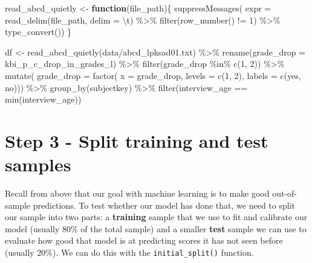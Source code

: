 \documentclass[
]{book}
\newenvironment{Shaded}{\begin{snugshade}}{\end{snugshade}}
\newcommand{\AttributeTok}[1]{\textcolor[rgb]{0.77,0.63,0.00}{#1}}
\newcommand{\ControlFlowTok}[1]{\textcolor[rgb]{0.13,0.29,0.53}{\textbf{#1}}}
\newcommand{\DecValTok}[1]{\textcolor[rgb]{0.00,0.00,0.81}{#1}}
\newcommand{\FunctionTok}[1]{\textcolor[rgb]{0.00,0.00,0.00}{#1}}
\newcommand{\NormalTok}[1]{#1}
\newcommand{\OtherTok}[1]{\textcolor[rgb]{0.56,0.35,0.01}{#1}}
\newcommand{\SpecialCharTok}[1]{\textcolor[rgb]{0.00,0.00,0.00}{#1}}
\newcommand{\StringTok}[1]{\textcolor[rgb]{0.31,0.60,0.02}{#1}}
\begin{document}
\begin{Shaded}
\begin{Highlighting}[]
\NormalTok{read\_abcd\_quietly }\OtherTok{\textless{}{-}} \ControlFlowTok{function}\NormalTok{(file\_path)\{}
  \FunctionTok{suppressMessages}\NormalTok{(}
    \AttributeTok{expr =} \FunctionTok{read\_delim}\NormalTok{(file\_path, }\AttributeTok{delim =} \StringTok{\textquotesingle{}}\SpecialCharTok{\textbackslash{}t}\StringTok{\textquotesingle{}}\NormalTok{) }\SpecialCharTok{\%\textgreater{}\%} 
      \FunctionTok{filter}\NormalTok{(}\FunctionTok{row\_number}\NormalTok{() }\SpecialCharTok{!=} \DecValTok{1}\NormalTok{) }\SpecialCharTok{\%\textgreater{}\%} 
      \FunctionTok{type\_convert}\NormalTok{())}
\NormalTok{\}}

\NormalTok{df }\OtherTok{\textless{}{-}} \FunctionTok{read\_abcd\_quietly}\NormalTok{(}\StringTok{\textquotesingle{}data/abcd\_lpksad01.txt\textquotesingle{}}\NormalTok{) }\SpecialCharTok{\%\textgreater{}\%} 
  \FunctionTok{rename}\NormalTok{(}\AttributeTok{grade\_drop =}\NormalTok{ kbi\_p\_c\_drop\_in\_grades\_l) }\SpecialCharTok{\%\textgreater{}\%} 
  \FunctionTok{filter}\NormalTok{(grade\_drop }\SpecialCharTok{\%in\%} \FunctionTok{c}\NormalTok{(}\DecValTok{1}\NormalTok{, }\DecValTok{2}\NormalTok{)) }\SpecialCharTok{\%\textgreater{}\%} 
  \FunctionTok{mutate}\NormalTok{(}
    \AttributeTok{grade\_drop =} \FunctionTok{factor}\NormalTok{(}
      \AttributeTok{x =}\NormalTok{ grade\_drop, }
      \AttributeTok{levels =} \FunctionTok{c}\NormalTok{(}\DecValTok{1}\NormalTok{, }\DecValTok{2}\NormalTok{), }
      \AttributeTok{labels =} \FunctionTok{c}\NormalTok{(}\StringTok{\textquotesingle{}yes\textquotesingle{}}\NormalTok{, }\StringTok{\textquotesingle{}no\textquotesingle{}}\NormalTok{))) }\SpecialCharTok{\%\textgreater{}\%}
  \FunctionTok{group\_by}\NormalTok{(subjectkey) }\SpecialCharTok{\%\textgreater{}\%} 
  \FunctionTok{filter}\NormalTok{(interview\_age }\SpecialCharTok{==} \FunctionTok{min}\NormalTok{(interview\_age))}
\end{Highlighting}
\end{Shaded}

\hypertarget{step-3---split-training-and-test-samples}{%
\section{Step 3 - Split training and test samples}\label{step-3---split-training-and-test-samples}}

Recall from above that our goal with machine learning is to make good out-of-sample predictions. To test whether our model has done that, we need to split our sample into two parts: a \textbf{training} sample that we use to fit and calibrate our model (usually 80\% of the total sample) and a smaller \textbf{test} sample we can use to evaluate how good that model is at predicting scores it has not seen before (usually 20\%). We can do this with the \texttt{initial\_split()} function.
\end{document}
